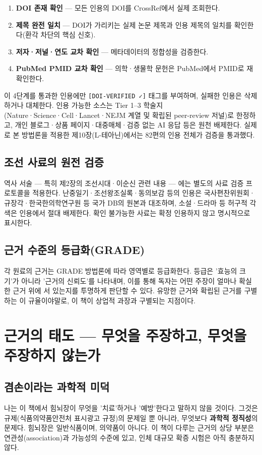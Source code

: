 \documentclass[11pt,oneside]{book}
\begin{document}
\begin{enumerate}[leftmargin=6mm,itemsep=1pt,topsep=2pt]
  \item \textbf{DOI 존재 확인} — 모든 인용의 DOI를 CrossRef에서 실제 조회한다.
  \item \textbf{제목 완전 일치} — DOI가 가리키는 실제 논문 제목과 인용 제목의 일치를 확인한다(환각 차단의 핵심 신호).
  \item \textbf{저자·저널·연도 교차 확인} — 메타데이터의 정합성을 검증한다.
  \item \textbf{PubMed PMID 교차 확인} — 의학·생물학 문헌은 PubMed에서 PMID로 재확인한다.
\end{enumerate}
이 4단계를 통과한 인용에만 \texttt{[DOI-VERIFIED ✓]} 태그를 부여하며, 실패한 인용은 삭제하거나 대체한다. 인용 가능한 소스는 Tier 1–3 학술지(Nature·Science·Cell·Lancet·NEJM 계열 및 확립된 peer-review 저널)로 한정하고, 개인 블로그·상품 페이지·대중매체·검증 없는 AI 응답 등은 원천 배제한다. 실제로 본 방법론을 적용한 제10장(L-테아닌)에서는 82편의 인용 전체가 검증을 통과했다.

\subsection{조선 사료의 원전 검증}
역사 서술 — 특히 제2장의 조선시대·이순신 관련 내용 — 에는 별도의 사료 검증 프로토콜을 적용한다. 난중일기·조선왕조실록·동의보감 등의 인용은 국사편찬위원회·규장각·한국한의학연구원 등 국가 DB의 원본과 대조하며, 소설·드라마 등 허구적 각색은 인용에서 절대 배제한다. 확인 불가능한 사료는 확정 인용하지 않고 명시적으로 표시한다.

\subsection{근거 수준의 등급화(GRADE)}
각 원료의 근거는 GRADE 방법론에 따라 영역별로 등급화한다. 등급은 '효능의 크기'가 아니라 '근거의 신뢰도'를 나타내며, 이를 통해 독자는 어떤 주장이 얼마나 확실한 근거 위에 서 있는지를 투명하게 판단할 수 있다. 유망한 근거와 확립된 근거를 구별하는 이 규율이야말로, 이 책이 상업적 과장과 구별되는 지점이다.

\section{근거의 태도 — 무엇을 주장하고, 무엇을 주장하지 않는가}
\subsection{겸손이라는 과학적 미덕}
나는 이 책에서 힘뇌장이 무엇을 '치료'하거나 '예방'한다고 말하지 않을 것이다. 그것은 규제(식품의약품안전처 표시광고 규정)의 문제일 뿐 아니라, 무엇보다 \textbf{과학적 정직성}의 문제다. 힘뇌장은 일반식품이며, 의약품이 아니다. 이 책이 다루는 근거의 상당 부분은 연관성(association)과 가능성의 수준에 있고, 인체 대규모 확증 시험은 아직 충분하지 않다.
\end{document}
